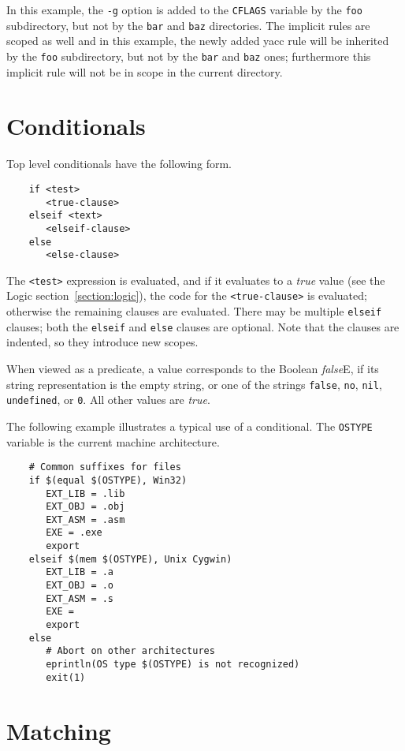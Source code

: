 In this example, the \verb+-g+ option is added to the \verb+CFLAGS+
variable by the \verb+foo+ subdirectory, but not by the \verb+bar+ and
\verb+baz+ directories. The implicit rules are scoped as well and in this
example, the newly added yacc rule will be inherited by the \verb+foo+
subdirectory, but not by the \verb+bar+ and \verb+baz+ ones; furthermore
this implicit rule will not be in scope in the current directory.

\section{Conditionals}
\label{section:conditionals}

Top level conditionals have the following form.

\begin{verbatim}
    if <test>
       <true-clause>
    elseif <text>
       <elseif-clause>
    else
       <else-clause>
\end{verbatim}

The \verb+<test>+ expression is evaluated, and if it evaluates to a
\emph{true} value (see the Logic section~\ref{section:logic}), the code for the
\verb+<true-clause>+ is evaluated; otherwise the remaining clauses
are evaluated.  There may be multiple \verb+elseif+ clauses;
both the \verb+elseif+ and \verb+else+ clauses are optional.
Note that the clauses are indented, so they introduce new
scopes.

When viewed as a predicate, a value corresponds to the Boolean \emph{false}E, if its string
representation is the empty string, or one of the strings \verb+false+, \verb+no+, \verb+nil+,
\verb+undefined+, or \verb+0+.  All other values are \emph{true}.

The following example illustrates a typical use of a conditional.  The
\verb+OSTYPE+ variable is the current machine architecture.

\begin{verbatim}
    # Common suffixes for files
    if $(equal $(OSTYPE), Win32)
       EXT_LIB = .lib
       EXT_OBJ = .obj
       EXT_ASM = .asm
       EXE = .exe
       export
    elseif $(mem $(OSTYPE), Unix Cygwin)
       EXT_LIB = .a
       EXT_OBJ = .o
       EXT_ASM = .s
       EXE =
       export
    else
       # Abort on other architectures
       eprintln(OS type $(OSTYPE) is not recognized)
       exit(1)
\end{verbatim}

\section{Matching}
\label{section:match}

